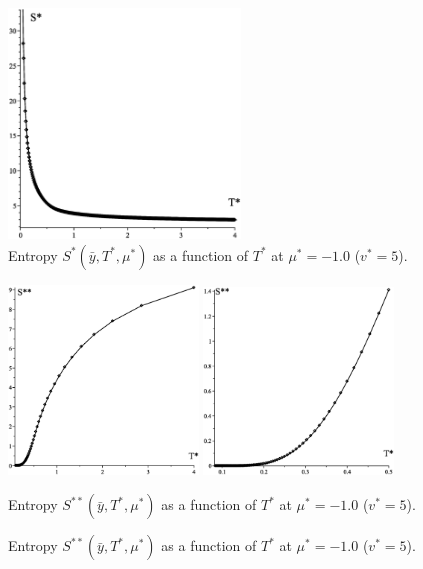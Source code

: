 \documentclass[12pt]{article}
\numberwithin{equation}{section}
\begin{document}
	\begin{figure}[htbp]
		\includegraphics[width=0.55\textwidth,angle=0]{S_vs_T1}
		\centering
		\captionsetup{width=0.5\textwidth}
		{\caption{\label{fig:S_vs_T1} Entropy $S^{*}(\bar{y},T^*,\mu^*)$ as a function of $T^*$ at $\mu^*=-1.0$ ($v^* = 5$).}}
	\end{figure}
	
	\begin{figure}[htbp]
		\includegraphics[width=0.45\textwidth,angle=0]{SS_vs_T1}
		\hfill
		\includegraphics[width=0.45\textwidth,angle=0]{SS_vs_T2}
		\\
		\parbox{0.45\textwidth}{\caption{\label{fig:SS_vs_T1} Entropy $S^{**}(\bar{y},T^*,\mu^*)$ as a function of $T^*$ at $\mu^*=-1.0$ ($v^* = 5$).}}
		\hfill
		\parbox{0.45\textwidth}{\caption{\label{fig:SS_vs_T2} Entropy $S^{**}(\bar{y},T^*,\mu^*)$ as a function of $T^*$ at $\mu^*=-1.0$ ($v^* = 5$).}}
	\end{figure}
	
\end{document}

